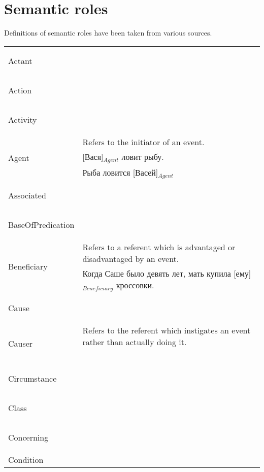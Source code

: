 \documentclass[a4paper,11pt, onecolumn,twoside]{article}
\begin{document}
\section{Semantic roles}
\label{sec:semroles}

Definitions of semantic roles have been taken from various sources.

\begin{longtable}{ p{}  p{} } 
\toprule
 \multirow{2}{*}{Actant} & ~ \\ 
        & ~ \\
\midrule
 \multirow{2}{*}{Action} & ~ \\ 
        & ~ \\
\midrule
 \multirow{2}{*}{Activity} & ~ \\ 
        & ~ \\
\midrule
 \multirow{3}{*}{Agent} & Refers to the initiator of an event. \\ 
        & [Вася]$_{Agent}$ ловит рыбу. \\
        & Рыба ловится [Васей]$_{Agent}$ \\
\midrule
 \multirow{2}{*}{Associated} & ~ \\ 
        & ~ \\
\midrule
 \multirow{2}{*}{BaseOfPredication} & ~ \\ 
        & ~ \\
\midrule
 \multirow{2}{*}{Beneficiary} & Refers to a referent which is advantaged or disadvantaged by an event. \\ 
        & Когда Саше было девять лет, мать купила [ему]$_{Beneficiary}$ кроссовки. \\
\midrule
 \multirow{2}{*}{Cause} & ~ \\ 
        & ~ \\
\midrule
 \multirow{2}{*}{Causer} & Refers to the referent which instigates an event rather than actually doing it. \\ 
        & ~ \\
\midrule
 \multirow{2}{*}{Circumstance} & ~ \\ 
        & ~ \\
\midrule
 \multirow{2}{*}{Class} & ~ \\ 
        & ~ \\
\midrule
 \multirow{2}{*}{Concerning} & ~ \\ 
        & ~ \\
\midrule
 \multirow{2}{*}{Condition} & ~ \\ 

\end{longtable}
\end{document}
